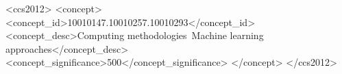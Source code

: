 \documentclass[acmtog, authorversion]{acmart}
\begin{document}




\begin{CCSXML}
    <ccs2012>
        <concept>
            <concept_id>10010147.10010257.10010293</concept_id>
            <concept_desc>Computing methodologies~Machine learning approaches</concept_desc>
            <concept_significance>500</concept_significance>
            </concept>
    </ccs2012>
\end{CCSXML}
\end{document}
